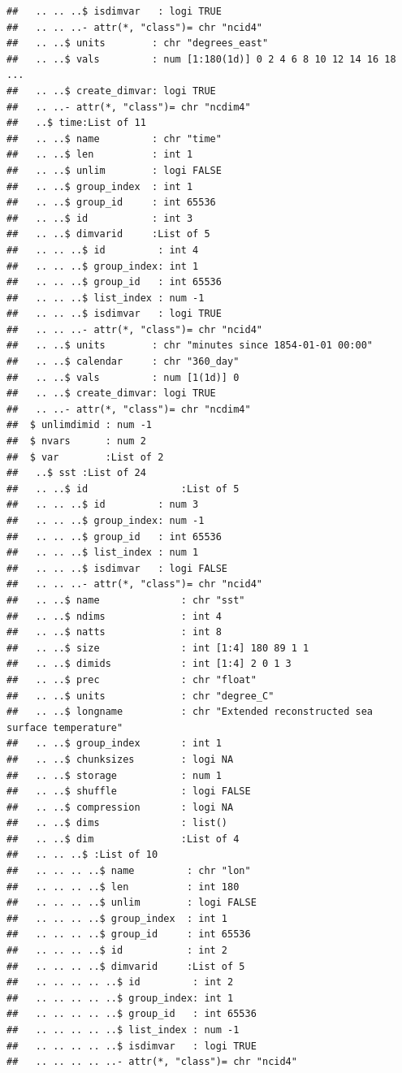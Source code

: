 \documentclass{article}\usepackage[]{graphicx}\usepackage[]{color}
\makeatletter
\newenvironment{kframe}{%
 \def\at@end@of@kframe{}%
 \ifinner\ifhmode%
  \def\at@end@of@kframe{\end{minipage}}%
  \begin{minipage}{\columnwidth}%
 \fi\fi%
 \def\FrameCommand##1{\hskip\@totalleftmargin \hskip-\fboxsep
 \colorbox{shadecolor}{##1}\hskip-\fboxsep
     \hskip-\linewidth \hskip-\@totalleftmargin \hskip\columnwidth}%
 \MakeFramed {\advance\hsize-\width
   \@totalleftmargin\z@ \linewidth\hsize
   \@setminipage}}%
 {\par\unskip\endMakeFramed%
 \at@end@of@kframe}
\newenvironment{knitrout}{}{} %
\makeatother
\begin{document}
\begin{knitrout}
\begin{kframe}
\begin{verbatim}
##   .. .. ..$ isdimvar   : logi TRUE
##   .. .. ..- attr(*, "class")= chr "ncid4"
##   .. ..$ units        : chr "degrees_east"
##   .. ..$ vals         : num [1:180(1d)] 0 2 4 6 8 10 12 14 16 18 ...
##   .. ..$ create_dimvar: logi TRUE
##   .. ..- attr(*, "class")= chr "ncdim4"
##   ..$ time:List of 11
##   .. ..$ name         : chr "time"
##   .. ..$ len          : int 1
##   .. ..$ unlim        : logi FALSE
##   .. ..$ group_index  : int 1
##   .. ..$ group_id     : int 65536
##   .. ..$ id           : int 3
##   .. ..$ dimvarid     :List of 5
##   .. .. ..$ id         : int 4
##   .. .. ..$ group_index: int 1
##   .. .. ..$ group_id   : int 65536
##   .. .. ..$ list_index : num -1
##   .. .. ..$ isdimvar   : logi TRUE
##   .. .. ..- attr(*, "class")= chr "ncid4"
##   .. ..$ units        : chr "minutes since 1854-01-01 00:00"
##   .. ..$ calendar     : chr "360_day"
##   .. ..$ vals         : num [1(1d)] 0
##   .. ..$ create_dimvar: logi TRUE
##   .. ..- attr(*, "class")= chr "ncdim4"
##  $ unlimdimid : num -1
##  $ nvars      : num 2
##  $ var        :List of 2
##   ..$ sst :List of 24
##   .. ..$ id                :List of 5
##   .. .. ..$ id         : num 3
##   .. .. ..$ group_index: num -1
##   .. .. ..$ group_id   : int 65536
##   .. .. ..$ list_index : num 1
##   .. .. ..$ isdimvar   : logi FALSE
##   .. .. ..- attr(*, "class")= chr "ncid4"
##   .. ..$ name              : chr "sst"
##   .. ..$ ndims             : int 4
##   .. ..$ natts             : int 8
##   .. ..$ size              : int [1:4] 180 89 1 1
##   .. ..$ dimids            : int [1:4] 2 0 1 3
##   .. ..$ prec              : chr "float"
##   .. ..$ units             : chr "degree_C"
##   .. ..$ longname          : chr "Extended reconstructed sea surface temperature"
##   .. ..$ group_index       : int 1
##   .. ..$ chunksizes        : logi NA
##   .. ..$ storage           : num 1
##   .. ..$ shuffle           : logi FALSE
##   .. ..$ compression       : logi NA
##   .. ..$ dims              : list()
##   .. ..$ dim               :List of 4
##   .. .. ..$ :List of 10
##   .. .. .. ..$ name         : chr "lon"
##   .. .. .. ..$ len          : int 180
##   .. .. .. ..$ unlim        : logi FALSE
##   .. .. .. ..$ group_index  : int 1
##   .. .. .. ..$ group_id     : int 65536
##   .. .. .. ..$ id           : int 2
##   .. .. .. ..$ dimvarid     :List of 5
##   .. .. .. .. ..$ id         : int 2
##   .. .. .. .. ..$ group_index: int 1
##   .. .. .. .. ..$ group_id   : int 65536
##   .. .. .. .. ..$ list_index : num -1
##   .. .. .. .. ..$ isdimvar   : logi TRUE
##   .. .. .. .. ..- attr(*, "class")= chr "ncid4"

\end{verbatim}
\end{kframe}
\end{knitrout}
\end{document}
